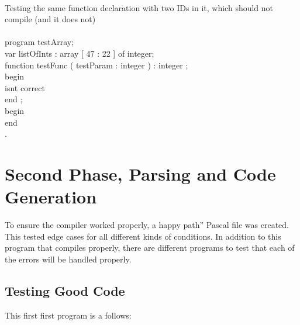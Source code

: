 \documentclass[12pt]{scrreprt}
\newcommand{\tab}{\hspace*{2em}}
\begin{document}
\\
Testing the same function declaration with two IDs in it, which should not
compile (and it does not)\\
\\
\tab	program testArray;\\
\tab	var listOfInts : array [ 47 : 22 ] of integer;\\
\tab	function testFunc ( testParam : integer ) : integer ;\\
\tab	begin\\
\tab	isnt correct\\
\tab	end ;\\
\tab	begin\\
\tab	end\\
\tab	.\\

\section{Second Phase, Parsing and Code Generation}

To ensure the compiler worked properly, a 	happy path'' Pascal file was
created. This tested edge cases for all different kinds of conditions.
In addition to this program that compiles properly, there are different 
programs to test that each of the errors will be handled properly.
\\
\subsection{Testing Good Code}
This first first program is a follows:\\
\end{document}
